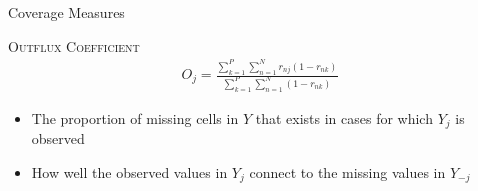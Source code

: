\documentclass{beamer}\usepackage[]{graphicx}\usepackage[]{color}
\newcommand{\rmsc}[1]{\textrm{\textsc{#1}}}
\begin{document}
\begin{frame}[allowframebreaks]{Coverage Measures}
  \pagebreak
  
  \rmsc{Outflux Coefficient}
  \begin{align*}
    O_j = \frac{\sum_{k = 1}^P \sum_{n = 1}^N r_{nj}(1 - r_{nk})}{\sum_{k = 1}^P \sum_{n = 1}^N (1 - r_{nk})}
  \end{align*}
  \begin{itemize}
  \item The proportion of missing cells in $Y$ that exists in cases for which 
    $Y_j$ is observed
  \item How well the observed values in $Y_j$ connect to the missing values in 
    $Y_{-j}$
  \end{itemize}
  
\end{frame}

\watermarkoff %
\end{document}
